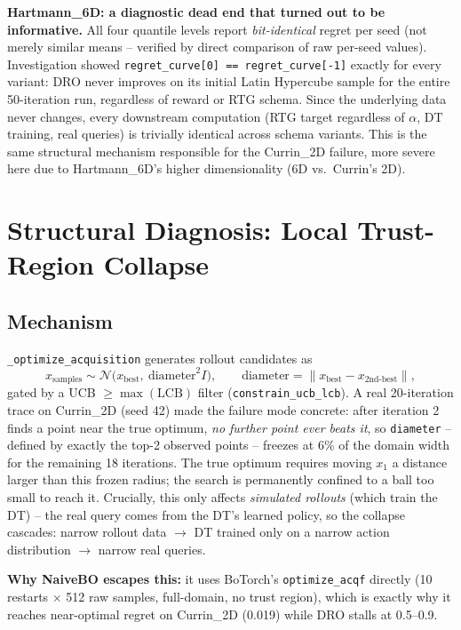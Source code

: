 \documentclass[11pt]{article}
\begin{document}
\textbf{Hartmann\_6D: a diagnostic dead end that turned out to be informative.}
All four quantile levels report \emph{bit-identical} regret per seed (not
merely similar means -- verified by direct comparison of raw per-seed values).
Investigation showed \texttt{regret\_curve[0] == regret\_curve[-1]} exactly for
every variant: DRO never improves on its initial Latin Hypercube sample for the
entire 50-iteration run, regardless of reward or RTG schema. Since the
underlying data never changes, every downstream computation (RTG target
regardless of $\alpha$, DT training, real queries) is trivially identical
across schema variants. This is the same structural mechanism responsible
for the Currin\_2D failure, more severe here due to Hartmann\_6D's higher
dimensionality (6D vs.\ Currin's 2D).

\FloatBarrier
\section{Structural Diagnosis: Local Trust-Region Collapse}
\label{sec:diagnosis}

\subsection{Mechanism}

\texttt{\_optimize\_acquisition} generates rollout candidates as
\[
x_{\text{samples}} \sim \mathcal{N}\big(x_{\text{best}},\ \text{diameter}^2 I\big), \qquad
\text{diameter} = \lVert x_{\text{best}} - x_{\text{2nd-best}} \rVert,
\]
gated by a UCB $\geq \max(\text{LCB})$ filter (\texttt{constrain\_ucb\_lcb}).
A real 20-iteration trace on Currin\_2D (seed 42) made the failure mode
concrete: after iteration 2 finds a point near the true optimum, \emph{no
further point ever beats it}, so \texttt{diameter} -- defined by exactly the
top-2 observed points -- freezes at 6\% of the domain width for the remaining
18 iterations. The true optimum requires moving $x_1$ a distance larger than
this frozen radius; the search is permanently confined to a ball too small to
reach it. Crucially, this only affects \emph{simulated rollouts} (which train
the DT) -- the real query comes from the DT's learned policy, so the collapse
cascades: narrow rollout data $\to$ DT trained only on a narrow action
distribution $\to$ narrow real queries.

\textbf{Why NaiveBO escapes this:} it uses BoTorch's \texttt{optimize\_acqf}
directly (10 restarts $\times$ 512 raw samples, full-domain, no trust region),
which is exactly why it reaches near-optimal regret on Currin\_2D
(0.019) while DRO stalls at 0.5--0.9.
\end{document}

